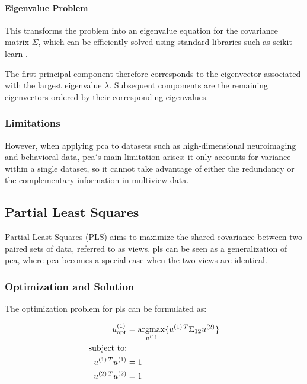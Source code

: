 \paragraph{Eigenvalue Problem}

This transforms the problem into an eigenvalue equation for the covariance matrix \(\Sigma\), which can be efficiently solved using standard libraries such as scikit-learn \citep{pedregosa2011scikit}.

The first principal component therefore corresponds to the eigenvector associated with the largest eigenvalue \(\lambda\).
Subsequent components are the remaining eigenvectors ordered by their corresponding eigenvalues.

\subsubsection{Limitations}
However, when applying \acrshort{pca} to datasets such as high-dimensional neuroimaging and behavioral
data, \acrshort{pca}\('\)s main limitation arises: it only accounts for variance within a single dataset, so it cannot take advantage of either the redundancy or the complementary information in multiview data.

\subsection{Partial Least Squares}

Partial Least Squares (PLS) \citep{wold1975path} aims to maximize the shared covariance between two paired sets of data, referred to as \gls{views}. \acrshort{pls} can be seen as a generalization of \acrshort{pca}, where \acrshort{pca} becomes a special case when the two \gls{views} are identical.

\subsubsection{Optimization and Solution}

The optimization problem for \acrshort{pls} can be formulated as:

\begin{align}
    u^{(1)}_{\text{opt}} & = \underset{u^{(1)}}{\mathrm{argmax}} \{ u^{(1)\,T} \Sigma_{12} u^{(2)} \} \\
    \text{subject to:} \notag                                                                             \\
    u^{(1)\,T}u^{(1)}   & = 1 \notag                                                                    \\
    u^{(2)\,T}u^{(2)}   & = 1 \notag
\end{align}

